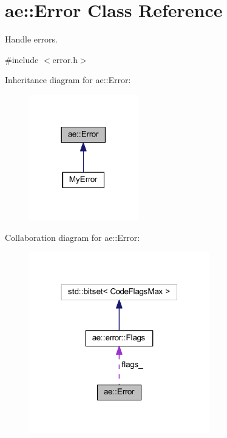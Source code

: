 \hypertarget{classae_1_1_error}{}\section{ae\+:\+:Error Class Reference}
\label{classae_1_1_error}


Handle errors.  




{\ttfamily \#include $<$error.\+h$>$}



Inheritance diagram for ae\+:\+:Error\+:
\nopagebreak
\begin{figure}[H]
\begin{center}
\leavevmode
\includegraphics[width=134pt]{classae_1_1_error__inherit__graph}
\end{center}
\end{figure}


Collaboration diagram for ae\+:\+:Error\+:
\nopagebreak
\begin{figure}[H]
\begin{center}
\leavevmode
\includegraphics[width=223pt]{classae_1_1_error__coll__graph}
\end{center}
\end{figure}
